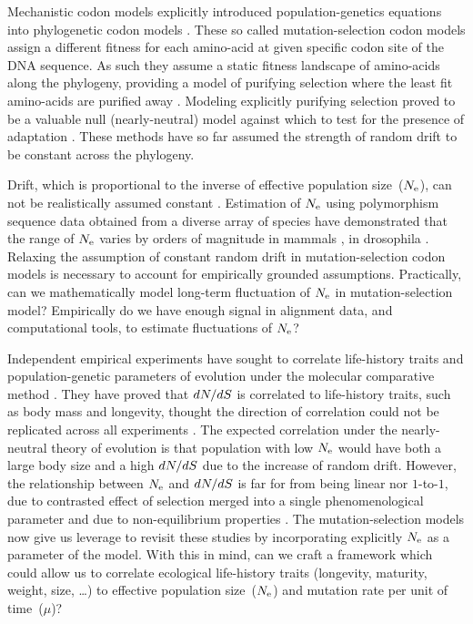 Mechanistic codon models explicitly introduced population-genetics equations into phylogenetic codon models \citep{Halpern1998}.
These so called mutation-selection codon models assign a different fitness for each amino-acid at given specific codon site of the DNA sequence.
As such they assume a static fitness landscape of amino-acids along the phylogeny, providing a model of purifying selection where the least fit amino-acids are purified away \citep{Rodrigue2010,Rodrigue2014,Tamuri2012,Tamuri2014}.
Modeling explicitly purifying selection proved to be a valuable null (nearly-neutral) model against which to test for the presence of adaptation \citep{Rodrigue2016,Bloom2017}.
These methods have so far assumed the strength of random drift to be constant across the phylogeny.

Drift, which is proportional to the inverse of effective population size~($N_{\mathrm{e}}$), can not be realistically assumed constant \citep{Ohta1992}.
Estimation of $N_{\mathrm{e}}$ using polymorphism sequence data obtained from a diverse array of species have demonstrated that the range of $N_{\mathrm{e}}$ varies by orders of magnitude in mammals \citep{Galtier2016}, in drosophila \citep{Benger2013,Keightley2016}.
Relaxing the assumption of constant random drift in mutation-selection codon models is necessary to account for empirically grounded
assumptions.
Practically, can we mathematically model long-term fluctuation of $N_{\mathrm{e}}$ in mutation-selection model?
Empirically do we have enough signal in alignment data, and computational tools, to estimate fluctuations of $N_{\mathrm{e}}$?

Independent empirical experiments have sought to correlate life-history traits and population-genetic parameters of evolution under the molecular comparative method \citep{Lartillot2011,Weber2014}.
They have proved that $dN/dS$ is correlated to life-history traits, such as body mass and longevity, thought the direction of correlation could not be replicated across all experiments \citep{Figuet2016}.
The expected correlation under the nearly-neutral theory of evolution is that population with low $N_{\mathrm{e}}$ would have both a large body size and a high $dN/dS$ due to the increase of random drift.
However, the relationship between $N_{\mathrm{e}}$ and $dN/dS$ is far for from being linear nor $1$-to-$1$, due to contrasted effect of selection merged into a single phenomenological parameter and due to non-equilibrium properties \citep{Jones2016}.
The mutation-selection models now give us leverage to revisit these studies by incorporating explicitly $N_{\mathrm{e}}$ as a parameter of the model.
With this in mind, can we craft a framework which could allow us to correlate ecological life-history traits (longevity, maturity, weight, size, \ldots) to effective population size~($N_{\mathrm{e}}$) and mutation rate per unit of time~($\mu$)?

